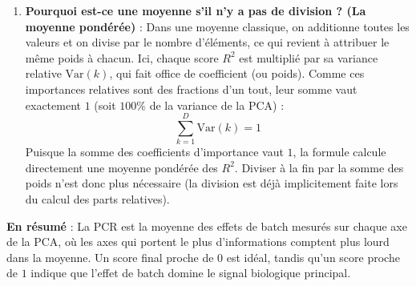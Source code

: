 \documentclass[11pt,a4paper]{article}
\begin{document}
\begin{enumerate}
    \item \textbf{Pourquoi est-ce une moyenne s'il n'y a pas de division ? (La moyenne pondérée)} :
    Dans une moyenne classique, on additionne toutes les valeurs et on divise par le nombre d'éléments, ce qui revient à attribuer le même poids à chacun. Ici, chaque score $R^2$ est multiplié par sa variance relative $\text{Var}(k)$, qui fait office de coefficient (ou poids). Comme ces importances relatives sont des fractions d'un tout, leur somme vaut exactement $1$ (soit $100\%$ de la variance de la PCA) :
    \[
    \sum_{k=1}^{D} \text{Var}(k) = 1
    \]
    Puisque la somme des coefficients d'importance vaut $1$, la formule calcule directement une moyenne pondérée des $R^2$. Diviser à la fin par la somme des poids n'est donc plus nécessaire (la division est déjà implicitement faite lors du calcul des parts relatives).
\end{enumerate}

\textbf{En résumé} : La PCR est la moyenne des effets de batch mesurés sur chaque axe de la PCA, où les axes qui portent le plus d'informations comptent plus lourd dans la moyenne. Un score final proche de $0$ est idéal, tandis qu'un score proche de $1$ indique que l'effet de batch domine le signal biologique principal.
\end{document}
